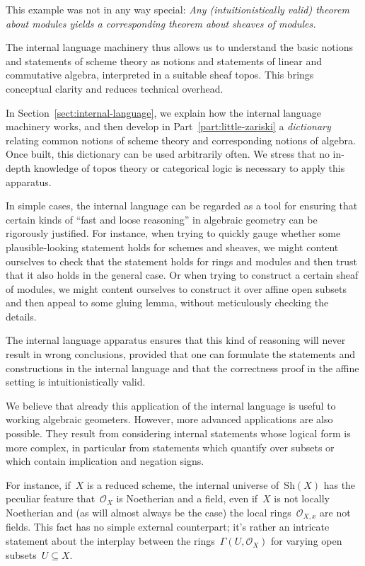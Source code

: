 \documentclass[10pt,reqno,a4paper]{amsbook}
\theoremstyle{definition}
\theoremstyle{plain}
\theoremstyle{remark}
\renewcommand{\O}{\mathcal{O}}
\newcommand{\Sh}{\mathrm{Sh}}
\newcommand{\?}{\,{:}\,}
\renewcommand{\_}{\mathpunct{.}\,}
\begin{document}
{This example was not in any way special: \emph{Any (intuitionistically valid) theorem
about modules yields a corresponding theorem about sheaves of modules.}

The internal language machinery thus allows us to understand the basic notions
and statements of scheme theory as notions and statements of linear and
commutative algebra, interpreted in a suitable sheaf topos. This brings
conceptual clarity and reduces technical overhead.

In Section~\ref{sect:internal-language}, we explain how the internal language
machinery works, and then develop in Part~\ref{part:little-zariski} a
\emph{dictionary} relating common notions of scheme theory and corresponding
notions of algebra. Once built, this dictionary can be used arbitrarily often.
We stress that no in-depth knowledge of topos theory or categorical logic is
necessary to apply this apparatus.

In simple cases, the internal language can be regarded as a tool for ensuring
that certain kinds of ``fast and loose reasoning'' in algebraic geometry can be
rigorously justified. For instance, when trying to quickly gauge whether some
plausible-looking statement holds for schemes and sheaves, we might content
ourselves to check that the statement holds for rings and modules and then trust
that it also holds in the general case. Or when trying to construct a certain
sheaf of modules, we might content ourselves to construct it over affine open
subsets and then appeal to some gluing lemma, without meticulously checking the
details.

The internal language apparatus ensures that this kind of reasoning will never
result in wrong conclusions, provided that one can formulate the statements and
constructions in the internal language and that the correctness proof in the
affine setting is intuitionistically valid.

We believe that already this application of the internal language is useful to
working algebraic geometers. However, more advanced applications are also
possible. They result from considering internal statements whose logical form
is more complex, in particular from statements which quantify over subsets or which
contain implication and negation signs.

For instance, if~$X$ is a reduced scheme,
the internal universe of~$\Sh(X)$ has the peculiar feature that~$\O_X$ is
Noetherian and a field, even if~$X$ is not locally Noetherian and (as will
almost always be the case) the local rings~$\O_{X,x}$ are not fields. This fact
has no simple external counterpart; it's rather an intricate statement about
the interplay between the rings~$\Gamma(U, \O_X)$ for varying open subsets~$U
\subseteq X$.

}
\end{document}
